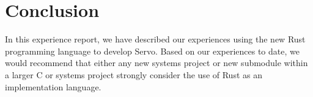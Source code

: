 \section{Conclusion}
\label{sec:concl}
In this experience report, we have described our experiences using the new Rust
programming language to develop Servo.
Based on our experiences to date, we would recommend that either any new systems
project or new submodule within a larger C or \Cplusplus{} systems project strongly
consider the use of Rust as an implementation language.
